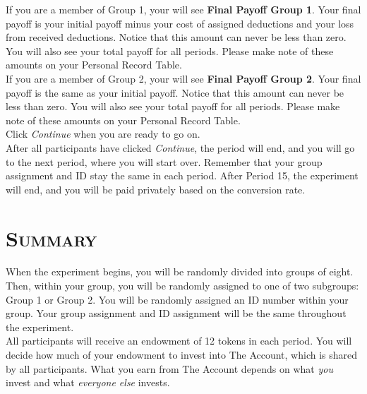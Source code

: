 \documentclass[12pt]{article}
\begin{document}
If you are a member of Group 1, your will see {\bf Final Payoff Group 1}.  Your final payoff is your initial payoff minus your cost of assigned deductions and your loss from received deductions.  Notice that this amount can never be less than zero.  You will also see your total payoff for all periods.  Please make note of these amounts on your Personal Record Table.\\

If you are a member of Group 2, your will see {\bf Final Payoff Group 2}. Your final payoff is the same as your initial payoff. Notice that this amount can never be less than zero.  You will also see your total payoff for all periods.  Please make note of these amounts on your Personal Record Table.\\
  
Click {\em Continue} when you are ready to go on.\\
 
After all participants have clicked {\em Continue}, the period will end, and you will go to the next period, where you will start over. Remember that your group assignment and ID stay the same in each period.  After Period 15, the experiment will end, and you will be paid privately based on the conversion rate.\\



\newpage

\section*{\scshape Summary}

\iffalse
When the experiment begins, you will be randomly divided into groups of eight.  Then, within your group, you will be randomly assigned to one of two subgroups: Group 1 or Group 2.  You will be randomly assigned an ID number within your group.  Your group assignment and ID assignment will be the same throughout the experiment.\\

All participants will receive an endowment of 12 tokens in each period.  You will decide how much of your endowment to invest into The Account, which is shared by all participants. What you earn from The Account depends on what {\em you} invest and what {\em everyone else} invests.\\  
\end{document}
